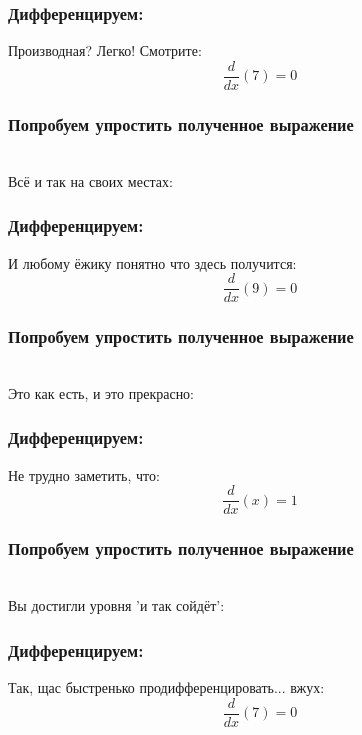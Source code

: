 \documentclass[a4paper,12pt]{article}
\begin{document}
\subsubsection*{Дифференцируем:}

Производная? Легко! Смотрите:
\begin{dmath}\frac{d}{dx}\left(7\right)=0\end{dmath}
\subsubsection*{Попробуем упростить полученное выражение}
\\Всё и так на своих местах:

\subsubsection*{Дифференцируем:}

И любому ёжику понятно что здесь получится:
\begin{dmath}\frac{d}{dx}\left(9\right)=0\end{dmath}
\subsubsection*{Попробуем упростить полученное выражение}
\\Это как есть, и это прекрасно:

\subsubsection*{Дифференцируем:}

Не трудно заметить, что:
\begin{dmath}\frac{d}{dx}\left(x\right)=1\end{dmath}
\subsubsection*{Попробуем упростить полученное выражение}
\\Вы достигли уровня 'и так сойдёт':

\subsubsection*{Дифференцируем:}

Так, щас быстренько продифференцировать... вжух:
\begin{dmath}\frac{d}{dx}\left(7\right)=0\end{dmath}
\end{document}

